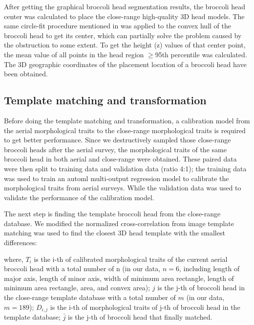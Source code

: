 

After getting the graphical broccoli head segmentation results, the broccoli head center was calculated to place the close-range high-quality 3D head models. The same circle-fit procedure mentioned in \citet{blok_image_2021} was applied to the convex hull of the broccoli head to get its center, which can partially solve the problem caused by the obstruction to some extent. To get the height (z) values of that center point, the mean value of all points in the head region $\geq$95th percentile was calculated. The 3D geographic coordinates of the placement location of a broccoli head have been obtained.

\subsection{Template matching and transformation}

Before doing the template matching and transformation, a calibration model from the aerial morphological traits to the close-range morphological traits is required to get better performance. Since we destructively sampled those close-range broccoli heads after the aerial survey, the morphological traits of the same broccoli head in both aerial and close-range were obtained. These paired data were then split to training data and validation data (ratio 4:1); the training data was used to train an \gls{automl} multi-output regression model \citep{feurer_auto-sklearn_2020} to calibrate the morphological traits from aerial surveys. While the validation data was used to validate the performance of the calibration model.

The next step is finding the template broccoli head from the close-range database. We modified the normalized cross-correlation \citep{yoo_fast_2009} from image template matching was used to find the closest 3D head template with the smallest differences:



\noindent
where, $T_i$ is the i-th of calibrated morphological traits of the current aerial broccoli head with a total number of n (in our data, $n=6$, including length of major axis, length of minor axis, width of minimum area rectangle, length of minimum area rectangle, area, and convex area); $j$ is the j-th of broccoli head in the close-range template database with a total number of $m$ (in our data, $m=189$); $D_{i,j}$ is the i-th of morphological traits of j-th of broccoli head in the template database; $\bar{j}$ is the j-th of broccoli head that finally matched.

